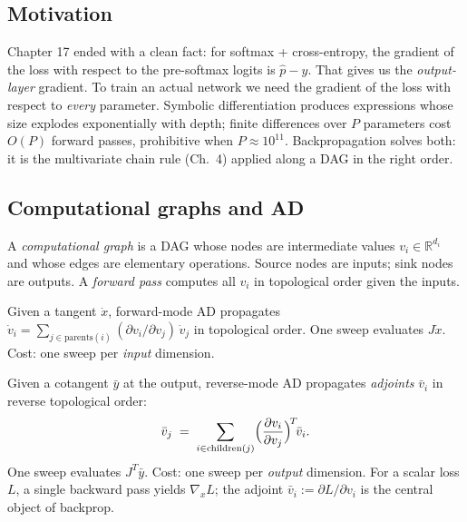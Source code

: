 \subsection*{Motivation}

Chapter 17 ended with a clean fact: for softmax + cross-entropy, the gradient
of the loss with respect to the pre-softmax logits is $\hat p - y$. That gives
us the \emph{output-layer} gradient. To train an actual network we need the
gradient of the loss with respect to \emph{every} parameter. Symbolic
differentiation produces expressions whose size explodes exponentially with
depth; finite differences over $P$ parameters cost $O(P)$ forward passes,
prohibitive when $P\!\approx\!10^{11}$. Backpropagation solves both: it is the
multivariate chain rule (Ch.~4) applied along a DAG in the right order.

\subsection*{Computational graphs and AD}

\begin{definition}
A \emph{computational graph} is a DAG whose nodes are intermediate values
$v_i\in\mathbb{R}^{d_i}$ and whose edges are elementary operations. Source
nodes are inputs; sink nodes are outputs. A \emph{forward pass} computes
all $v_i$ in topological order given the inputs.
\end{definition}

\begin{definition}
Given a tangent $\dot x$, forward-mode AD propagates
$\dot v_i = \sum_{j\in\mathrm{parents}(i)} (\partial v_i/\partial v_j)\,\dot v_j$
in topological order. One sweep evaluates $J\dot x$. Cost: one sweep per
\emph{input} dimension.
\end{definition}

\begin{definition}
Given a cotangent $\bar y$ at the output, reverse-mode AD propagates
\emph{adjoints} $\bar v_i$ in reverse topological order:
\[
  \bar v_j \;=\; \sum_{i\in\mathrm{children}(j)}
   \Bigl(\frac{\partial v_i}{\partial v_j}\Bigr)^{\!T}\!\bar v_i.
\]
One sweep evaluates $J^{T}\bar y$. Cost: one sweep per \emph{output}
dimension. For a scalar loss $L$, a single backward pass yields $\nabla_x L$;
the adjoint $\bar v_i := \partial L/\partial v_i$ is the central object of
backprop.
\end{definition}

